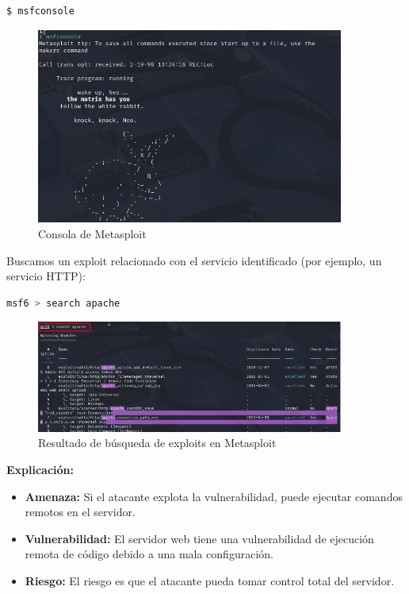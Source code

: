 \documentclass[12pt,a4paper]{article}
\begin{document}
\begin{lstlisting}[language=bash, caption=Iniciando Metasploit]
$ msfconsole
\end{lstlisting}

\begin{figure}[H]
    \centering
    \includegraphics[width=0.9\textwidth]{metasploit_start.png}
    \caption{Consola de Metasploit}
    \label{fig:metasploit_start}
\end{figure}

Buscamos un exploit relacionado con el servicio identificado (por ejemplo, un servicio HTTP):

\begin{lstlisting}[language=bash, caption=Buscando exploits en Metasploit]
msf6 > search apache
\end{lstlisting}

\begin{figure}[H]
    \centering
    \includegraphics[width=0.9\textwidth]{metasploit_search.png}
    \caption{Resultado de búsqueda de exploits en Metasploit}
    \label{fig:metasploit_search}
\end{figure}

\textbf{Explicación:}
\begin{itemize}
    \item \textbf{Amenaza:} Si el atacante explota la vulnerabilidad, puede ejecutar comandos remotos en el servidor.
    \item \textbf{Vulnerabilidad:} El servidor web tiene una vulnerabilidad de ejecución remota de código debido a una mala configuración.
    \item \textbf{Riesgo:} El riesgo es que el atacante pueda tomar control total del servidor.
\end{itemize}
\end{document}
